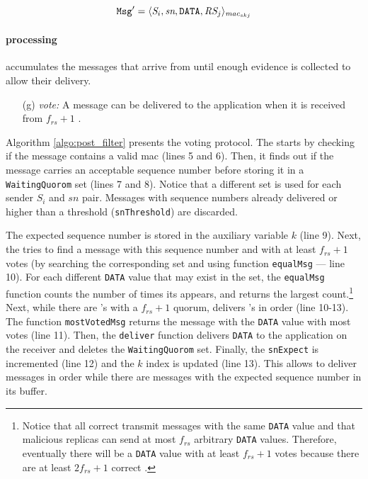 \begin{equation}
\texttt{Msg}' = \langle \emph{S}_i, \emph{sn}, \texttt{DATA}, \emph{RS}_j \rangle_{\emph{mac}_{skj}}
\label{msgl}
\end{equation}

\paragraph{\Postsieve processing}

\Postsieve accumulates the messages that arrive from \repsieves until enough evidence is collected to allow their delivery.

\begin{enumerate}
\item[(g)] \textit{vote:} A message can be delivered to the application when it is received from $f_{rs} + 1$ \repsieves.

\end{enumerate}

Algorithm \ref{algo:post_filter} presents the \postsieve voting protocol.
The \postsieve starts by checking if the message contains a valid \gls{mac} (lines 5 and 6).
Then, it finds out if the message carries an acceptable sequence number before storing it in a \texttt{WaitingQuorom} set (lines 7 and 8).
Notice that a different set is used for each sender $S_i$ and $sn$ pair.
Messages with sequence numbers already delivered or higher than a threshold (\texttt{snThreshold}) are discarded.

The expected sequence number is stored in the auxiliary variable $k$ (line 9).
Next, the \postsieve tries to find a message with this sequence number and with at least $f_{rs} + 1$ votes (by searching the corresponding set and using function \texttt{equalMsg} --- line 10).
For each different \texttt{DATA} value that may exist in the set, the \texttt{equalMsg} function counts the number of times its appears, and returns the largest count.\footnote{Notice that all correct \repsieves transmit messages with the same \texttt{DATA} value and that malicious replicas can send at most $f_{rs}$ arbitrary \texttt{DATA} values.
Therefore, eventually there will be a \texttt{DATA} value with at least $f_{rs}+1$ votes because there are at least $2f_{rs}+1$ correct \repsieves.}
Next, while there are \msg's with a $f_{rs} + 1$ quorum, \postsieve delivers \msg's in order (line 10-13).
The function \texttt{mostVotedMsg} returns the message with the \texttt{DATA} value with most votes (line 11).
Then, the \texttt{deliver} function delivers \texttt{DATA} to the application on the receiver and deletes the \texttt{WaitingQuorom} set.
Finally, the \texttt{snExpect} is incremented (line 12) and the $k$ index is updated (line 13).
This allows \postsieve to deliver messages in order while there are messages with the expected sequence number in its buffer.

